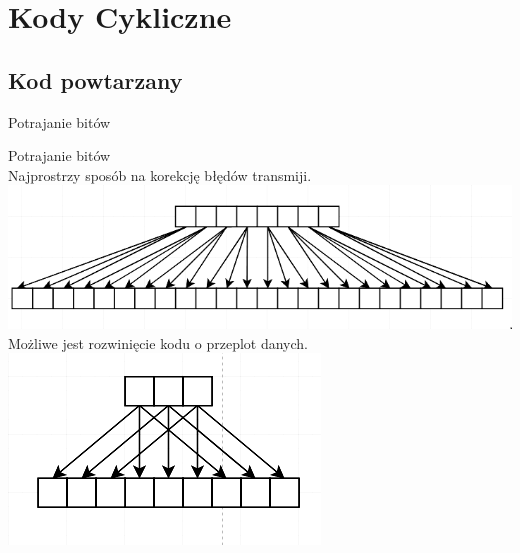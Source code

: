 \documentclass[12pt]{beamer}
\begin{document}
\section{Kody Cykliczne}
\setcounter{section}{1}

\subsection{Kod powtarzany}
\begin{frame}{Potrajanie bitów}
\begin{center}
Potrajanie bitów\\
Najprostrzy sposób na korekcję błędów transmiji.
\includegraphics[scale= 0.25]{Potrajanie/potrajanie_proste.png}\\
Możliwe jest rozwinięcie kodu o przeplot danych.
\includegraphics[scale=0.25]{Potrajanie/potrajanie_przeplot.png}

\end{center}

\end{frame}
\end{document}
